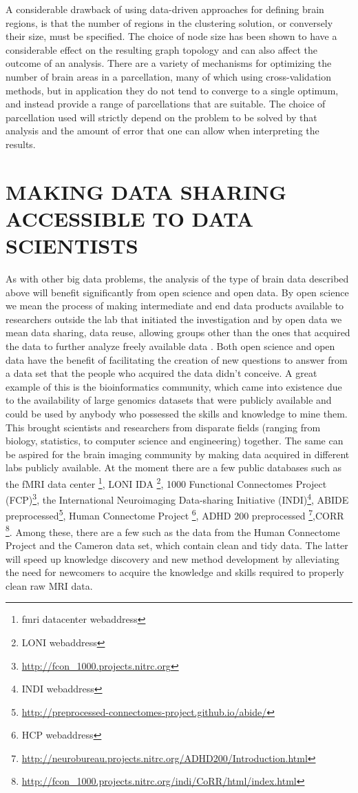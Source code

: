 A considerable drawback of using data-driven approaches for defining brain
regions, is that the number of regions in the clustering solution, or
conversely their size, must be specified. The choice of node size has been
shown to have a considerable effect on the resulting graph topology
\cite{Zalesky} and can also affect the outcome of an analysis\cite{Cecci_2009}.
There are a variety of mechanisms for optimizing the number of brain areas in a
parcellation, many of which using cross-validation methods, but in application
they do not tend to converge to a single optimum, and instead provide a range
of parcellations that are suitable\cite{craddock2012}. The choice of
parcellation used will strictly depend on the problem to be solved by that
analysis and the amount of error that one can allow when interpreting the
results. 


\section{MAKING DATA SHARING ACCESSIBLE TO DATA SCIENTISTS}

As with other big data problems, the analysis of the type of brain data
described above will benefit significantly from open science and open data. By
open science we mean the process of making intermediate and end data products
available to researchers outside the lab that initiated the investigation and
by open data we mean data sharing, data reuse, allowing groups other than the
ones that acquired the data to further analyze freely available data
\cite{Milham2012}. Both open science and open data have the benefit of
facilitating the creation of new questions to answer from a data set that the
people who acquired the data didn't conceive. A great example of this is the
bioinformatics community, which came into existence due to the availability of
large genomics datasets that were publicly available and could be used by
anybody who possessed the skills and knowledge to mine them\cite{VanHorn2013}.
This brought scientists and researchers from disparate fields (ranging from
biology, statistics, to computer science and engineering) together. The same
can be aspired for the brain imaging community by making data acquired in
different labs publicly available. At the moment there are a few public
databases such as the fMRI data center \footnote{fmri datacenter webaddress},
LONI IDA \footnote{LONI webaddress}, 1000 Functional Connectomes Project
(FCP)\footnote{\url{http://fcon_1000.projects.nitrc.org}}, the International
Neuroimaging Data-sharing Initiative (INDI)\footnote{INDI webaddress}, ABIDE
preprocessed\footnote{\url{http://preprocessed-connectomes-project.github.io/abide/}},
Human Connectome Project \footnote{HCP webaddress}, ADHD 200 preprocessed
\footnote{\url{http://neurobureau.projects.nitrc.org/ADHD200/Introduction.html}},CORR
\footnote{\url{http://fcon_1000.projects.nitrc.org/indi/CoRR/html/index.html}}.
Among these, there are a few such as the data from the Human Connectome Project
and the Cameron data set, which contain clean and tidy data. The latter will
speed up knowledge discovery and new method development by alleviating the need
for newcomers to acquire the knowledge and skills required to properly clean
raw MRI data. 


